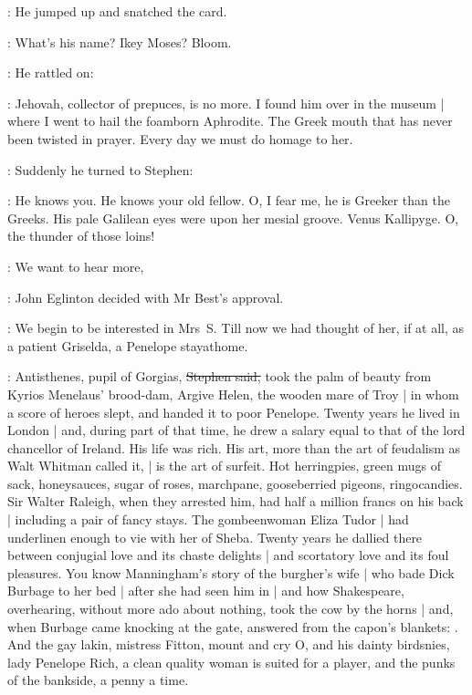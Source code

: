 :
He jumped up and snatched the card.

\mulligan:
What's his name?
Ikey Moses?
Bloom.

:
He rattled on:

\mulligan:
Jehovah,
collector of prepuces,
is no more.
I found him over in the museum |
where I went to hail the foamborn Aphrodite.
The Greek mouth that has never been twisted in prayer.
Every day we must do homage to her.

:
Suddenly he turned to Stephen:

\mulligan:
He knows you.
He knows your old fellow.
O, I fear me,
he is Greeker than the Greeks.
His pale Galilean eyes were upon her mesial groove.
Venus Kallipyge.
O, the thunder of those loins!

\eglinton:
We want to hear more,

:
John Eglinton decided with Mr Best's approval.

\eglinton:
We begin to be interested in Mrs~S\@.
Till now we had thought of her,
if at all,
as a patient Griselda,
a Penelope stayathome.

\Stephen:
Antisthenes, pupil of Gorgias,
\sout{Stephen said,}
took the palm of beauty from Kyrios Menelaus' brood-dam,
Argive Helen, the wooden mare of Troy |
in whom a score of heroes slept,
and handed it to poor Penelope.
Twenty years he lived in London |
and, during part of that time,
he drew a salary equal to that of the lord chancellor of Ireland.
His life was rich.
His art,
more than the art of feudalism as Walt Whitman called it, |
is the art of surfeit.
Hot herringpies,
green mugs of sack,
honeysauces,
sugar of roses,
marchpane,
gooseberried pigeons,
ringocandies.
Sir Walter Raleigh,
when they arrested him,
had half a million francs on his back |
including a pair of fancy stays.
The gombeenwoman Eliza Tudor |
had underlinen enough to vie with her of Sheba.
Twenty years he dallied there between conjugial love and its chaste delights |
and scortatory love and its foul pleasures.
You know Manningham's story of the burgher's wife |
who bade Dick Burbage to her bed |
after she had seen him in  |
and how Shakespeare,
overhearing,
without more ado about nothing,
took the cow by the horns |
and, when Burbage came knocking at the gate,
answered from the capon's blankets:
.
And the gay lakin,
mistress Fitton,
mount and cry O,
and his dainty birdsnies,
lady Penelope Rich,
a clean quality woman is suited for a player,
and the punks of the bankside,
a penny a time.

